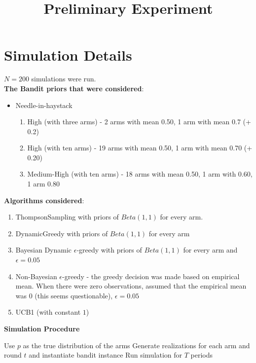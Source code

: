 \documentclass[11pt,letterpaper]{article}
\begin{document}
 

\title{Preliminary Experiment}
\maketitle

\section*{Simulation Details}

$N = 200$ simulations were run. \\
\textbf{The Bandit priors that were considered}:
\begin{itemize}
\item Needle-in-haystack
\begin{enumerate}
\item High (with three arms) - 2 arms with mean 0.50, 1 arm with mean 0.7 (+ 0.2)
\item High (with ten arms) - 19 arms with mean 0.50, 1 arm with mean 0.70 (+ 0.20)
\item Medium-High (with ten arms) - 18 arms with mean 0.50, 1 arm with 0.60, 1 arm 0.80
\end{enumerate}
\end{itemize}
\textbf{Algorithms considered}:
\begin{enumerate}
\item ThompsonSampling with priors of $Beta(1, 1)$ for every arm.
\item DynamicGreedy with priors of $Beta(1, 1)$ for every arm
\item Bayesian Dynamic $\epsilon$-greedy with priors of $Beta(1, 1)$ for every arm and $\epsilon = 0.05$
\item Non-Bayesian $\epsilon$-greedy - the greedy decision was made based on empirical mean. When there were zero observations, assumed that the empirical mean was 0 (this seems questionable), $\epsilon = 0.05$
\item UCB1 (with constant $1$)
\end{enumerate}
\pagebreak
\textbf{Simulation Procedure}
\begin{algorithm}
\begin{algorithmic}[1]
		\State Use $p$ as the true distribution of the arms
		\State Generate realizations for each arm and round $t$ and instantiate bandit instance
			\State Run simulation for $T$ periods
		\EndFor
	\EndFor
\EndFor
\end{algorithmic}
\end{algorithm}
\end{document}
